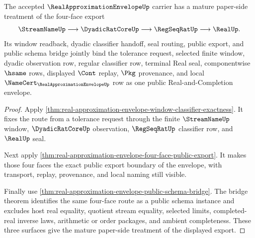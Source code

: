 \begin{theorem}
\label{thm:real-approximation-envelope-mature-treatment}
The accepted $\RealApproximationEnvelopeUp$ carrier has a mature paper-side treatment of the four-face export
$$
\StreamNameUp \longrightarrow \DyadicRatCoreUp \longrightarrow \RegSeqRatUp \longrightarrow \RealUp .
$$
Its window readback, dyadic classifier handoff, seal routing, public export, and public schema bridge jointly bind the tolerance request, selected finite window, dyadic observation row, regular classifier row, terminal Real seal, componentwise $\hsame$ rows, displayed $\Cont$ replay, $\Pkg$ provenance, and local $\NameCert_{\RealApproximationEnvelopeUp}$ row as one public Real-and-Completion envelope.
\end{theorem}
\begin{proof}
Apply \autoref{thm:real-approximation-envelope-window-classifier-exactness}. It fixes the route from a tolerance request through the finite $\StreamNameUp$ window, $\DyadicRatCoreUp$ observation, $\RegSeqRatUp$ classifier row, and $\RealUp$ seal.

Next apply \autoref{thm:real-approximation-envelope-four-face-public-export}. It makes those four faces the exact public export boundary of the envelope, with transport, replay, provenance, and local naming still visible.

Finally use \autoref{thm:real-approximation-envelope-public-schema-bridge}. The bridge theorem identifies the same four-face route as a public schema instance and excludes host real equality, quotient stream equality, selected limits, completed-real inverse laws, arithmetic or order packages, and ambient completeness. These three surfaces give the mature paper-side treatment of the displayed export.
\end{proof}


